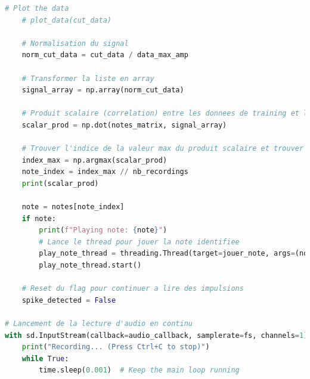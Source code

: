 ﻿\documentclass[11pt,letterpaper]{article}
\begin{document}
\begin{lstlisting}[language=python]
    # Plot the data
    # plot_data(cut_data)

    # Normalisation du signal
    norm_cut_data = cut_data / data_max_amp

    # Transformer la liste en array
    signal_array = np.array(norm_cut_data)

    # Produit scalaire (correlation) entre les donnees de training et le signal test
    scalar_prod = np.dot(notes_matrix, signal_array)

    # Trouver l'indice de la valeur max du produit scalaire et trouver sa note correspondante
    index_max = np.argmax(scalar_prod)
    note_index = index_max // nb_recordings
    print(scalar_prod)

    note = notes[note_index]
    if note:
        print(f"Playing note: {note}")
        # Lance le thread pour jouer la note identifiee
        play_note_thread = threading.Thread(target=jouer_note, args=(note,))
        play_note_thread.start()
    
    # Reset du flag pour continuer a lire des impulsions
    spike_detected = False

# Lancement de la lecture d'audio en continu
with sd.InputStream(callback=audio_callback, samplerate=fs, channels=1):
    print("Recording... (Press Ctrl+C to stop)")
    while True:
        time.sleep(0.001)  # Keep the main loop running
\end{lstlisting}


\clearpage
\printbibliography
% 
% 
\end{document}
